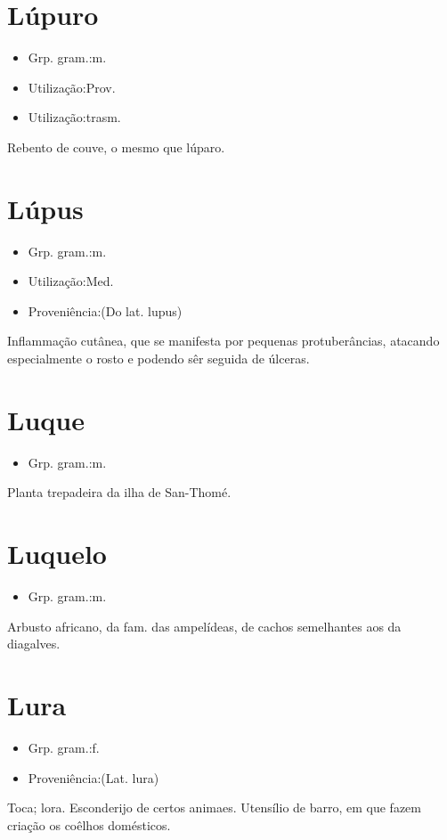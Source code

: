 \section{Lúpuro}
\begin{itemize}
\item {Grp. gram.:m.}
\end{itemize}
\begin{itemize}
\item {Utilização:Prov.}
\end{itemize}
\begin{itemize}
\item {Utilização:trasm.}
\end{itemize}
Rebento de couve, o mesmo que \textunderscore lúparo\textunderscore .
\section{Lúpus}
\begin{itemize}
\item {Grp. gram.:m.}
\end{itemize}
\begin{itemize}
\item {Utilização:Med.}
\end{itemize}
\begin{itemize}
\item {Proveniência:(Do lat. \textunderscore lupus\textunderscore )}
\end{itemize}
Inflammação cutânea, que se manifesta por pequenas protuberâncias, atacando especialmente o rosto e podendo sêr seguida de úlceras.
\section{Luque}
\begin{itemize}
\item {Grp. gram.:m.}
\end{itemize}
Planta trepadeira da ilha de San-Thomé.
\section{Luquelo}
\begin{itemize}
\item {Grp. gram.:m.}
\end{itemize}
Arbusto africano, da fam. das ampelídeas, de cachos semelhantes aos da diagalves.
\section{Lura}
\begin{itemize}
\item {Grp. gram.:f.}
\end{itemize}
\begin{itemize}
\item {Proveniência:(Lat. \textunderscore lura\textunderscore )}
\end{itemize}
Toca; lora.
Esconderijo de certos animaes.
Utensílio de barro, em que fazem criação os coêlhos domésticos.
